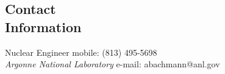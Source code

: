 \documentclass[margin,line]{resume}
\begin{document}
\begin{resume}



    \vspace{-3mm}
    \section{\mysidestyle Contact\\Information}
    Nuclear Engineer \hfill mobile: (813) 495-5698 \vspace{0mm}\\\vspace{0mm}%
    \textsl{Argonne National Laboratory} \hfill e-mail: abachmann@anl.gov           \vspace{0mm}\\\vspace{0mm}%
    \vspace{-2mm}\\\vspace{-10mm}%


\end{resume}
\end{document}
